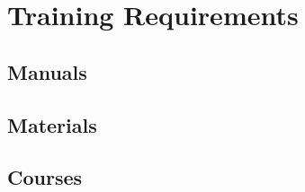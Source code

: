 \KNEADSECTIONNEWPAGE
\section{Training Requirements}
\label{lab:sec_Training}


\KNEADSUBSECTIONNEWPAGE
\subsection{Manuals}
\label{lab:sec_TrainingManuals}




\KNEADSUBSECTIONNEWPAGE
\subsection{Materials}
\label{lab:sec_TrainingMaterials}




\KNEADSUBSECTIONNEWPAGE
\subsection{Courses}
\label{lab:sec_TrainingCourses}

